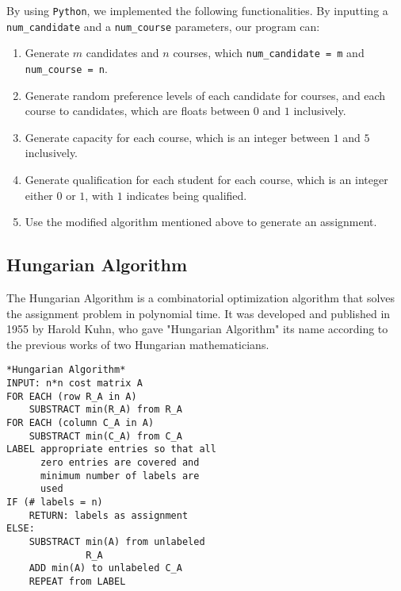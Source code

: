 \documentclass[twoside,twocolumn]{article}
\begin{document}
    By using \verb|Python|, we implemented the following functionalities. 
    By inputting a \verb|num_candidate| and a \verb|num_course| parameters, our program can:
    \begin{enumerate}
        \item Generate $m$ candidates and $n$ courses, which \verb|num_candidate = m| and \verb|num_course = n|.
        \item Generate random preference levels of each candidate for courses, and each course to candidates, which are
        floats between $0$ and $1$ inclusively.
        \item Generate capacity for each course, which is an integer between $1$ and $5$ inclusively.
        \item Generate qualification for each student for each course, which is an integer either $0$ or $1$, with $1$ indicates
        being qualified.
        \item Use the modified algorithm mentioned above to generate an assignment.
    \end{enumerate}

    \subsection{Hungarian Algorithm}
    The Hungarian Algorithm is a combinatorial optimization algorithm that solves the assignment problem in polynomial time.
    It was developed and published in 1955 by Harold Kuhn, who gave "Hungarian Algorithm" its name according to the previous works
    of two Hungarian mathematicians.
    \begin{lstlisting}
*Hungarian Algorithm*
INPUT: n*n cost matrix A
FOR EACH (row R_A in A)
    SUBSTRACT min(R_A) from R_A
FOR EACH (column C_A in A)
    SUBSTRACT min(C_A) from C_A
LABEL appropriate entries so that all
      zero entries are covered and 
      minimum number of labels are 
      used
IF (# labels = n)
    RETURN: labels as assignment    
ELSE:
    SUBSTRACT min(A) from unlabeled 
              R_A
    ADD min(A) to unlabeled C_A
    REPEAT from LABEL
    \end{lstlisting}
\end{document}
